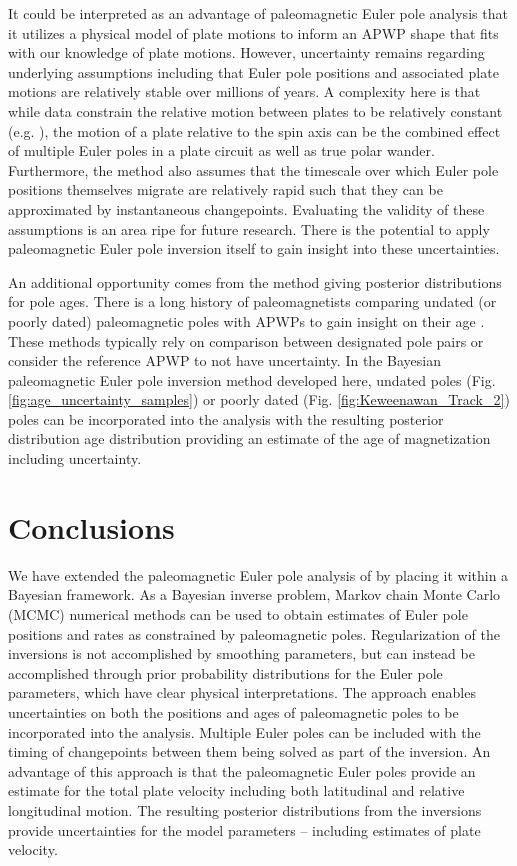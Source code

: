 \documentclass[]{agujournal2019}
\begin{document}
It could be interpreted as an advantage of paleomagnetic Euler pole analysis that it utilizes a physical model of plate motions to inform an APWP shape that fits with our knowledge of plate motions. However, uncertainty remains regarding underlying assumptions including that Euler pole positions and associated plate motions are relatively stable over millions of years. A complexity here is that while data constrain the relative motion between plates to be relatively constant (e.g. ), the motion of a plate relative to the spin axis can be the combined effect of multiple Euler poles in a plate circuit as well as true polar wander. Furthermore, the method also assumes that the timescale over which Euler pole positions themselves migrate are relatively rapid such that they can be approximated by instantaneous changepoints. Evaluating the validity of these assumptions is an area ripe for future research. There is the potential to apply paleomagnetic Euler pole inversion itself to gain insight into these uncertainties.

An additional opportunity comes from the method giving posterior distributions for pole ages. There is a long history of paleomagnetists comparing undated (or poorly dated) paleomagnetic poles with APWPs to gain insight on their age \cite{McCabe1984b, Hnatyshin2014a}. These methods typically rely on comparison between designated pole pairs or consider the reference APWP to not have uncertainty. In the Bayesian paleomagnetic Euler pole inversion method developed here, undated poles (Fig. \ref{fig:age_uncertainty_samples}) or poorly dated (Fig. \ref{fig:Keweenawan_Track_2}) poles can be incorporated into the analysis with the resulting posterior distribution age distribution providing an estimate of the age of magnetization including uncertainty. 

\section*{Conclusions}
\label{sec:conclusions}

We have extended the paleomagnetic Euler pole analysis of  by placing it within a Bayesian framework. As a Bayesian inverse problem, Markov chain Monte Carlo (MCMC) numerical methods can be used to obtain estimates of Euler pole positions and rates as constrained by paleomagnetic poles. Regularization of the inversions is not accomplished by smoothing parameters, but can instead be accomplished through prior probability distributions for the Euler pole parameters, which have clear physical interpretations. The approach enables uncertainties on both the positions and ages of paleomagnetic poles to be incorporated into the analysis. Multiple Euler poles can be included with the timing of changepoints between them being solved as part of the inversion. An advantage of this approach is that the paleomagnetic Euler poles provide an estimate for the total plate velocity including both latitudinal and relative longitudinal motion. The resulting posterior distributions from the inversions provide uncertainties for the model parameters -- including estimates of plate velocity.
\end{document}
